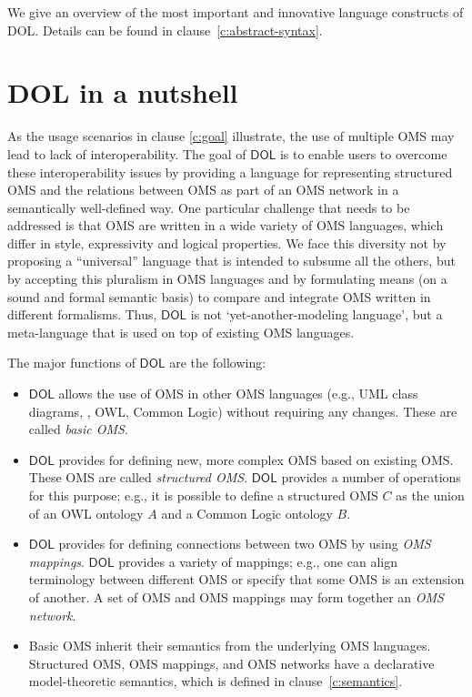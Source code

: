 \documentclass[10pt,fleqn,%
\ifpretendfinal
final%
\else
draft%
\fi,
]{scrreprt}
\makeatletter
\newcommand*\CommentAuthor{}
\renewcommand*\CommentAuthor{#1}}
\newcommand*\CommentDate{}
\renewcommand*\CommentDate{#1}}
\newcommand*\CommentId{}
\renewcommand*\CommentId{#1}}
\newcommand*\CommentType{}
\renewcommand*\CommentType{#1}}
\newcommand*{\SetCommentColorByType}[1]{%
\edef\localType{{#1}}%
\expandafter\ifstrequal\localType{q-aut}{\colorlet{CommentColor}{red}}{%
\expandafter\ifstrequal\localType{q-all}{\colorlet{CommentColor}{orange}}{%
\expandafter\ifstrequal\localType{todo}{\colorlet{CommentColor}{orange}}{%
\expandafter\ifstrequal\localType{fyi}{\colorlet{CommentColor}{lightgray}}{%
\colorlet{CommentColor}{yellow}}}}}}
\newcommand*{\SetCommentPrefixByType}[1]{%
\edef\localType{{#1}}%
\expandafter\@ifmtarg\localType{%
\edef\CommentPrefix{}%
}{%
\caseupper[q]{#1}%
\edef\CommentPrefix{\thestring: }%
}}
\newcommand*{\initComment}[1]{%
\setkeys{Comment}{#1}%
\SetCommentColorByType{\CommentType}%
\relax%
\SetCommentPrefixByType{\CommentType}%
\relax%
}
\newcommand*{\todonote}[2][]{%
\initComment{#1}%
\pdfcomment[author=\CommentAuthor,color=CommentColor,date=\CommentDate,id=\CommentId]{%
\CommentPrefix
#2}}
\renewcommand*{\todonote}[2][]{%
\initComment{#1}%
\ednote{\CommentPrefix #2}}
\newcommand*{\DOL}{\ensuremath{\mathsf{DOL}}\xspace}
\newcommand{\clauserefname}{clause}
\newcommand{\cref}[1]{\clauserefname~\ref{#1}}
\makeatother
\begin{document}
%
%
\label{c:design:overview}
%

We give an overview of the most important and innovative language
constructs of DOL. Details can be found in clause~\ref{c:abstract-syntax}.

\section{DOL in a nutshell}

As the usage scenarios in clause \ref{c:goal} illustrate, the use of multiple OMS may lead to lack 
 of interoperability. The goal of \DOL is to enable users to overcome these interoperability issues by providing a language for representing 
structured OMS and the relations between OMS as part of an OMS network in a semantically well-defined way. One particular challenge that needs to be
addressed is that OMS are written in a wide variety of OMS languages, which differ in style, 
expressivity and logical properties. 
We face this diversity not by proposing a
``universal'' language that is intended to subsume all the others, but by accepting
this pluralism in OMS languages and by formulating means (on a sound and formal semantic basis) to
 compare and integrate OMS written in different formalisms. Thus, \DOL is not `yet-another-modeling
language', but a meta-language that is used on top of existing OMS languages. 

The major functions of \DOL are the following: 
\begin{itemize}
		\item \DOL allows the use of OMS in other OMS languages (e.g., UML class diagrams, \CASL, 
		OWL, Common Logic) without requiring any changes. These are called \emph{basic OMS}.  
		\item \DOL provides for defining new, more complex  OMS based on existing OMS. These OMS are
		called \emph{structured OMS}. \DOL provides a number of operations for this purpose; e.g.,
		it is possible to define a structured OMS $C$ as the union of an OWL
		ontology $A$ and a Common Logic ontology $B$.
		\item \DOL provides for defining connections between two OMS by using 
		\emph{OMS mappings}. \DOL provides a variety of mappings; e.g.,  one can align terminology 
		between different OMS or specify that some OMS is an extension of another. A set of OMS
		and OMS mappings may form together an \emph{OMS network}.
		\item Basic OMS inherit their semantics from the underlying OMS languages. Structured OMS, 
		OMS mappings, and OMS networks have a declarative model-theoretic semantics, which is 
		 defined in \cref{c:semantics}.  
\end{itemize}
 
\end{document}
